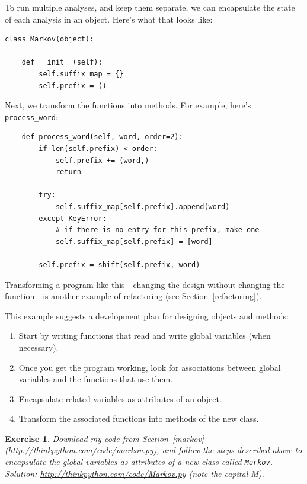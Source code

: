 \documentclass[12pt,a4paper,final,twoside,onecolumn,titlepage]{book}
\newtheorem{exercise}{Exercise}[chapter]
\begin{document}
To run multiple analyses, and keep them separate, we can encapsulate
the state of each analysis in an object.
Here's what that looks like:

\begin{verbatim}
class Markov(object):

    def __init__(self):
        self.suffix_map = {}
        self.prefix = ()    
\end{verbatim}

Next, we transform the functions into methods.  For example,
here's \verb"process_word":

\begin{verbatim}
    def process_word(self, word, order=2):
        if len(self.prefix) < order:
            self.prefix += (word,)
            return

        try:
            self.suffix_map[self.prefix].append(word)
        except KeyError:
            # if there is no entry for this prefix, make one
            self.suffix_map[self.prefix] = [word]

        self.prefix = shift(self.prefix, word)        
\end{verbatim}

Transforming a program like this---changing the design without
changing the function---is another example of refactoring
(see Section~\ref{refactoring}).

This example suggests a development plan for designing objects and
methods:

\begin{enumerate}

\item Start by writing functions that read and write global
variables (when necessary).

\item Once you get the program working, look for associations
between global variables and the functions that use them.

\item Encapsulate related variables as attributes of an object.

\item Transform the associated functions into methods of the new
class.

\end{enumerate}


\begin{exercise}

Download my code from Section~\ref{markov}
(\url{http://thinkpython.com/code/markov.py}), and follow the steps described
above to encapsulate the global variables as attributes of a new class
called {\tt Markov}.  Solution: \url{http://thinkpython.com/code/Markov.py}
(note the capital M).

\end{exercise}
\end{document}
